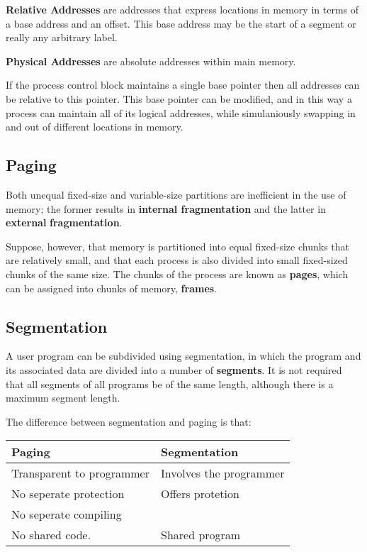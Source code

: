 \documentclass[11pt]{article}
\begin{document}
\textbf{Relative Addresses} are addresses that express locations in memory in
terms of a base address and an offset. This base address may be the
start of a segment or really any arbitrary label.

\textbf{Physical Addresses} are absolute addresses within main memory.

If the process control block maintains a single base pointer then all 
addresses can be relative to this pointer. This base pointer can be modified,
and in this way a process can maintain all of its logical addresses, while
simulaniously swapping in and out of different locations in memory.

\subsection{Paging}
\label{sec:orgheadline19}

Both unequal fixed-size and variable-size partitions are 
inefficient in the use of memory; the former results in
\textbf{internal fragmentation} and the latter in \textbf{external}
\textbf{fragmentation}. 

Suppose, however, that memory is partitioned into equal 
fixed-size chunks that are relatively small, and that 
each process is also divided into small fixed-sized chunks 
of the same size. The chunks of the process are known as
\textbf{pages}, which can be assigned into chunks of memory, \textbf{frames}.

\subsection{Segmentation}
\label{sec:orgheadline20}

A user program can be subdivided using segmentation, in which
the program and its associated data are divided into a number
of \textbf{segments}. It is not required that all segments of all 
programs be of the same length, although there is a maximum 
segment length.

The difference between segmentation and paging is that:

\begin{center}
\begin{tabular}{ll}
Paging & Segmentation\\
\hline
Transparent to programmer & Involves the programmer\\
No seperate protection & Offers protetion\\
No seperate compiling & \\
No shared code. & Shared program\\
\end{tabular}
\end{center}
\end{document}
